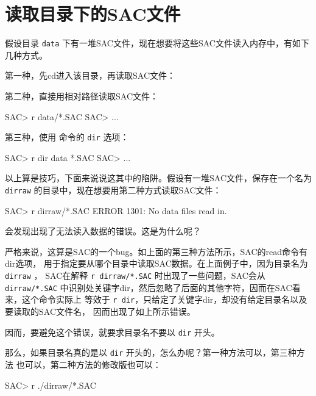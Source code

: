 \section{读取目录下的SAC文件}
\label{sec:read-dir}
假设目录 \texttt{data} 下有一堆SAC文件，现在想要将这些SAC文件读入内存中，有如下
几种方式。

第一种，先cd进入该目录，再读取SAC文件：

第二种，直接用相对路径读取SAC文件：
\begin{SACCode}
SAC> r data/*.SAC
SAC> ...
\end{SACCode}

第三种，使用 命令的 \texttt{dir} 选项：
\begin{SACCode}
SAC> r dir data *.SAC
SAC> ...
\end{SACCode}

以上算是技巧，下面来说说这其中的陷阱。假设有一堆SAC文件，保存在一个名为
\texttt{dirraw} 的目录中，现在想要用第二种方式读取SAC文件：
\begin{SACCode}
SAC> r dirraw/*.SAC
 ERROR 1301: No data files read in.
\end{SACCode}
会发现出现了无法读入数据的错误。这是为什么呢？

严格来说，这算是SAC的一个bug。如上面的第三种方法所示，SAC的read命令有dir选项，
用于指定要从哪个目录中读取SAC数据。在上面例子中，因为目录名为 \texttt{dirraw} ，
SAC在解释 \texttt{r dirraw/*.SAC} 时出现了一些问题，SAC会从 \texttt{dirraw/*.SAC}
中识别处关键字dir，然后忽略了后面的其他字符，因而在SAC看来，这个命令实际上
等效于 \texttt{r dir}，只给定了关键字dir，却没有给定目录名以及要读取的SAC文件名，
因而出现了如上所示错误。

因而，要避免这个错误，就要求目录名不要以 \texttt{dir} 开头。

那么，如果目录名真的是以 \texttt{dir} 开头的，怎么办呢？第一种方法可以，第三种方法
也可以，第二种方法的修改版也可以：
\begin{SACCode}
SAC> r ./dirraw/*.SAC
\end{SACCode}
